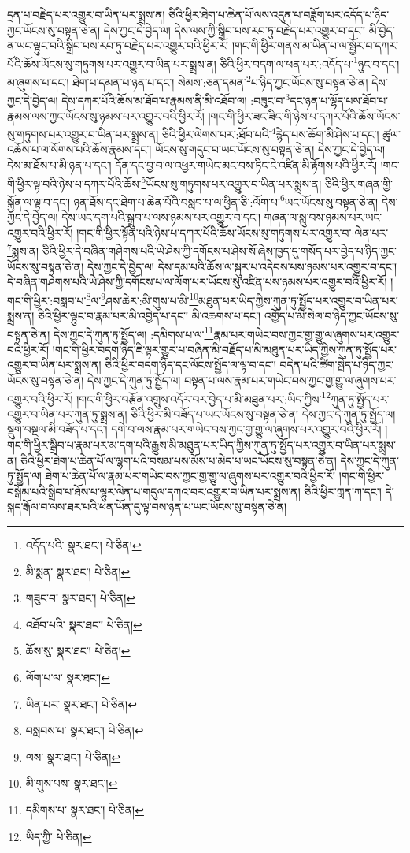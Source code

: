 དྲན་པ་བརྗེད་པར་འགྱུར་བ་ཡིན་པར་སྨྲས་ན། ཅིའི་ཕྱིར་ཐེག་པ་ཆེན་པོ་ལས་འདུན་པ་བཟློག་པར་འདོད་པ་ཉིད་ཀྱང་ཡོངས་སུ་བསྟན་ཅེ་ན། དེས་ཀྱང་དེ་བྱེད་ལ། དེས་ལས་ཀྱི་སྒྲིབ་པས་རབ་ཏུ་བརྗེད་པར་འགྱུར་བ་དང་། མི་བྱེད་ན་ཡང་ལྟུང་བའི་སྒྲིབ་པས་རབ་ཏུ་བརྗེད་པར་འགྱུར་བའི་ཕྱིར་རོ། །གང་གི་ཕྱིར་གནས་མ་ཡིན་པ་ལ་སྦྱོར་བ་དཀར་པོའི་ཆོས་ཡོངས་སུ་གཏུགས་པར་འགྱུར་བ་ཡིན་པར་སྨྲས་ན། ཅིའི་ཕྱིར་བདག་ལ་ཕན་པར་:འདོད་པ་\footnote{འདོད་པའི་  སྣར་ཐང་།  པེ་ཅིན། }ཉུང་བ་དང་། མ་ཞུགས་པ་དང་། ཐེག་པ་དམན་པ་ཉན་པ་དང་། སེམས་:ཅན་དམན་\footnote{མི་སྨན་  སྣར་ཐང་།  པེ་ཅིན། }པ་ཉིད་ཀྱང་ཡོངས་སུ་བསྟན་ཅེ་ན། དེས་ཀྱང་དེ་བྱེད་ལ། དེས་དཀར་པོའི་ཆོས་མ་ཐོབ་པ་རྣམས་ནི་མི་འཐོབ་ལ། :བཟུང་བ་\footnote{གཟུང་བ་  སྣར་ཐང་།  པེ་ཅིན། }དང་ཉན་པ་ལྷོད་པས་ཐོབ་པ་རྣམས་ལས་ཀྱང་ཡོངས་སུ་ཉམས་པར་འགྱུར་བའི་ཕྱིར་རོ། །གང་གི་ཕྱིར་ཟང་ཟིང་གི་ཉེས་པ་དཀར་པོའི་ཆོས་ཡོངས་སུ་གཏུགས་པར་འགྱུར་བ་ཡིན་པར་སྨྲས་ན། ཅིའི་ཕྱིར་ལེགས་པར་:ཐོབ་པའི་\footnote{འཐོབ་པའི་  སྣར་ཐང་།  པེ་ཅིན། }རྙེད་པས་ཆོག་མི་ཤེས་པ་དང་། ཚུལ་འཆོས་པ་ལ་སོགས་པའི་ཆོས་རྣམས་དང་། ཡོངས་སུ་གདུང་བ་ཡང་ཡོངས་སུ་བསྟན་ཅེ་ན། དེས་ཀྱང་དེ་བྱེད་ལ། དེས་མ་ཐོས་པ་མི་ཉན་པ་དང་། དོན་དང་བྱ་བ་ལ་འཕྱར་གཡེང་མང་བས་ཏིང་ངེ་འཛིན་མི་རྟོགས་པའི་ཕྱིར་རོ། །གང་གི་ཕྱིར་ལྟ་བའི་ཉེས་པ་དཀར་པོའི་ཆོས་\footnote{ཆོས་སུ་  སྣར་ཐང་།  པེ་ཅིན། }ཡོངས་སུ་གཏུགས་པར་འགྱུར་བ་ཡིན་པར་སྨྲས་ན། ཅིའི་ཕྱིར་གཞན་གྱི་སྐྱོན་ལ་ལྟ་བ་དང་། ཉན་ཐོས་དང་ཐེག་པ་ཆེན་པོའི་བསླབ་པ་ལ་ཕྱིན་ཅི་:ལོག་པ་\footnote{ལོག་པ་ལ་  སྣར་ཐང་། }ཡང་ཡོངས་སུ་བསྟན་ཅེ་ན། དེས་ཀྱང་དེ་བྱེད་ལ། དེས་ཡང་དག་པའི་སྒྲུབ་པ་ལས་ཉམས་པར་འགྱུར་བ་དང་། གཞན་ལ་སླུ་བས་ཉམས་པར་ཡང་འགྱུར་བའི་ཕྱིར་རོ། །གང་གི་ཕྱིར་སྟོན་པའི་ཉེས་པ་དཀར་པོའི་ཆོས་ཡོངས་སུ་གཏུགས་པར་འགྱུར་བ་:ལེན་པར་\footnote{ཡིན་པར་  སྣར་ཐང་།  པེ་ཅིན། }སྨྲས་ན། ཅིའི་ཕྱིར་དེ་བཞིན་གཤེགས་པའི་ཡེ་ཤེས་ཀྱི་དགོངས་པ་ཤེས་སོ་ཞེས་ཁྱད་དུ་གསོད་པར་བྱེད་པ་ཉིད་ཀྱང་ཡོངས་སུ་བསྟན་ཅེ་ན། དེས་ཀྱང་དེ་བྱེད་ལ། དེས་དམ་པའི་ཆོས་ལ་སྐུར་པ་འདེབས་པས་ཉམས་པར་འགྱུར་བ་དང་། དེ་བཞིན་གཤེགས་པའི་ཡེ་ཤེས་ཀྱི་དགོངས་པ་ལ་ལོག་པར་ཡོངས་སུ་འཛིན་པས་ཉམས་པར་འགྱུར་བའི་ཕྱིར་རོ། །གང་གི་ཕྱིར་:བསླབ་པ་\footnote{བསླབས་པ་  སྣར་ཐང་།  པེ་ཅིན། }ལ་\footnote{ལས་  སྣར་ཐང་།  པེ་ཅིན། }ཤས་ཆེར་:མི་གུས་པ་མི་\footnote{མི་གུས་པས་  སྣར་ཐང་། }མཐུན་པར་ཡིད་ཀྱིས་ཀུན་ཏུ་སྤྱོད་པར་འགྱུར་བ་ཡིན་པར་སྨྲས་ན། ཅིའི་ཕྱིར་ལྟུང་བ་རྣམ་པར་མི་འབྱེད་པ་དང་། མི་འཆགས་པ་དང་། འགྱོད་པ་མི་སེལ་བ་ཉིད་ཀྱང་ཡོངས་སུ་བསྟན་ཅེ་ན། དེས་ཀྱང་དེ་ཀུན་ཏུ་སྤྱོད་ལ། :དམིགས་པ་ལ་\footnote{དམིགས་པ་  སྣར་ཐང་།  པེ་ཅིན། }རྣམ་པར་གཡེང་བས་ཀྱང་གྱ་གྱུ་ལ་ཞུགས་པར་འགྱུར་བའི་ཕྱིར་རོ། །གང་གི་ཕྱིར་བདག་ཉིད་ཇི་ལྟར་གྱུར་པ་བཞིན་མི་བརྗོད་པ་མི་མཐུན་པར་ཡིད་ཀྱིས་ཀུན་ཏུ་སྤྱོད་པར་འགྱུར་བ་ཡིན་པར་སྨྲས་ན། ཅིའི་ཕྱིར་བདག་ཉིད་དང་ལོངས་སྤྱོད་ལ་ལྟ་བ་དང་། བདེན་པའི་ཚིག་སྦེད་པ་ཉིད་ཀྱང་ཡོངས་སུ་བསྟན་ཅེ་ན། དེས་ཀྱང་དེ་ཀུན་ཏུ་སྤྱོད་ལ། བསྟན་པ་ལས་རྣམ་པར་གཡེང་བས་ཀྱང་གྱ་གྱུ་ལ་ཞུགས་པར་འགྱུར་བའི་ཕྱིར་རོ། །གང་གི་ཕྱིར་བརྩོན་འགྲུས་འདོར་བར་བྱེད་པ་མི་མཐུན་པར་:ཡིད་ཀྱིས་\footnote{ཡིད་ཀྱི་  པེ་ཅིན། }ཀུན་ཏུ་སྤྱོད་པར་འགྱུར་བ་ཡིན་པར་ཀུན་ཏུ་སྨྲས་ན། ཅིའི་ཕྱིར་མི་བཟོད་པ་ཡང་ཡོངས་སུ་བསྟན་ཅེ་ན། དེས་ཀྱང་དེ་ཀུན་ཏུ་སྤྱོད་ལ། སྡུག་བསྔལ་མི་བཟོད་པ་དང་། དགེ་བ་ལས་རྣམ་པར་གཡེང་བས་ཀྱང་གྱ་གྱུ་ལ་ཞུགས་པར་འགྱུར་བའི་ཕྱིར་རོ། །གང་གི་ཕྱིར་སྒྲིབ་པ་རྣམ་པར་མ་དག་པའི་རྒྱུས་མི་མཐུན་པར་ཡིད་ཀྱིས་ཀུན་ཏུ་སྤྱོད་པར་འགྱུར་བ་ཡིན་པར་སྨྲས་ན། ཅིའི་ཕྱིར་ཐེག་པ་ཆེན་པོ་ལ་ལྷག་པའི་བསམ་པས་མོས་པ་མེད་པ་ཡང་ཡོངས་སུ་བསྟན་ཅེ་ན། དེས་ཀྱང་དེ་ཀུན་ཏུ་སྤྱོད་ལ། ཐེག་པ་ཆེན་པོ་ལ་རྣམ་པར་གཡེང་བས་ཀྱང་གྱ་གྱུ་ལ་ཞུགས་པར་འགྱུར་བའི་ཕྱིར་རོ། །གང་གི་ཕྱིར་བསྒོམ་པའི་སྒྲིབ་པ་ཐོས་པ་ལྷུར་ལེན་པ་གདུལ་དཀའ་བར་འགྱུར་བ་ཡིན་པར་སྨྲས་ན། ཅིའི་ཕྱིར་ཀླན་ཀ་དང་། དེ་སྐད་རྒོལ་བ་ལས་ཐར་པའི་ཕན་ཡོན་དུ་ལྟ་བས་ཉན་པ་ཡང་ཡོངས་སུ་བསྟན་ཅེ་ན། 